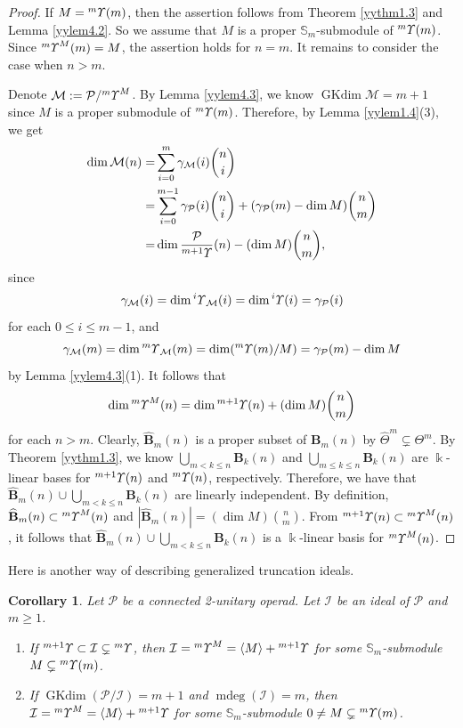\documentclass{amsart}
\newtheorem{cor}[thm]{Corollary}
\theoremstyle{definition}
\theoremstyle{remark}
\numberwithin{equation}{section}
\def\S{\mathbb{S}}
\def\mdeg{\operatorname{mdeg}}
\newcommand{\up}[1]{{^{#1}{\it \!\Upsilon}}}
\def \I{\mathcal{I}}
\def \ip{{\mathcal{P}}}
\def \dim{\operatorname{dim}}
\def\gkdim{\operatorname{GKdim}}
\def \S{\mathbb{S}}
\begin{document}
\begin{proof} If $M=\up{m}(m)$, then the assertion follows
from Theorem \ref{yythm1.3} and Lemma \ref{yylem4.2}. So 
we assume that $M$ is a proper $\S_m$-submodule of 
$\up{m}(m)$. Since $\up{m}^M(m)=M$, the assertion holds for
$n=m$. It remains to consider the case when $n>m$. 

Denote $\mathcal{M}:=\ip/\up{m}^M$. By Lemma \ref{yylem4.3}, 
we know $\gkdim \mathcal{M}=m+1$ since $M$ is a proper 
submodule of $\up{m}(m)$. Therefore, by Lemma \ref{yylem1.4}(3), 
we get
\begin{align*}
		\dim \mathcal{M}(n)
		=&\sum_{i=0}^m \gamma_\mathcal{M}(i){n\choose i}\\
		=&\sum_{i=0}^{m-1} \gamma_\ip(i){n\choose i}
		+(\gamma_\ip(m)-\dim M){n\choose m}\\
		=& \dim \frac{\ip}{\up{m+1}}(n)-(\dim M){n\choose m},
\end{align*}
since 
$$\gamma_\mathcal{M}(i)=\dim \up{i}_{\mathcal{M}}(i)
=\dim \up{i}(i)=\gamma_\ip(i)$$ 
for each $0\le i\le m-1$, and 
$$\gamma_\mathcal{M}(m)=\dim \up{m}_{\mathcal{M}}(m)
=\dim (\up{m}(m)/M)=\gamma_\ip(m)-\dim M$$ 
by Lemma \ref{yylem4.3}(1). It follows that 
\[\dim \up{m}^M(n)=\dim \up{m+1}(n)+(\dim M){n\choose m}\]
for each $n>m$. Clearly, $\widehat{\textbf{B}}_m(n)$ is a 
proper subset of $\textbf{B}_m(n)$ by 
$\widehat{\Theta}^m\subsetneq \Theta^m$. By Theorem 
\ref{yythm1.3}, we know $\bigcup_{m<k\le n}\textbf{B}_k(n)$ and 
$\bigcup_{m\le k\le n}\textbf{B}_k(n)$ are $\Bbbk$-linear bases 
for $\up{m+1}(n)$ and $\up{m}(n)$, respectively. Therefore, 
we have that  
$\widehat{\textbf{B}}_m(n)\cup \bigcup_{m<k\le n}\textbf{B}_k(n)$ 
are linearly independent. By definition, 
$\widehat{\textbf{B}}_m(n)\subset \up{m}^M(n)$ and 
$|\widehat{\textbf{B}}_m(n)|=(\dim M){n\choose m}$. From 
$\up{m+1}(n)\subset \up{m}^M(n)$, it follows that 
$\widehat{\textbf{B}}_m(n)\cup \bigcup_{m<k\le n}\textbf{B}_k(n)$ 
is a $\Bbbk$-linear basis for $\up{m}^M(n)$.
\end{proof}

Here is another way of describing generalized truncation ideals.

\begin{cor}	
\label{yycor4.5}
Let $\ip$ be a connected 2-unitary operad. Let $\I$ be an ideal 
of $\ip$ and $m\geq 1$.
\begin{enumerate}
\item[(1)]
If $\up{m+1}\subset \I\subsetneq \up{m}$, 
then $\I=\up{m}^M=\langle M\rangle +\up{m+1}$ 
for some $\S_m$-submodule $M\subsetneq \up{m}(m)$.
\item[(2)]
If $\gkdim (\ip/\I)=m+1$ and $\mdeg(\I)=m$, then 
$\I=\up{m}^M=\langle M\rangle +\up{m+1}$ 
for some $\S_m$-submodule $0\neq M\subsetneq \up{m}(m)$.
\end{enumerate}
\end{cor}
\end{document}
